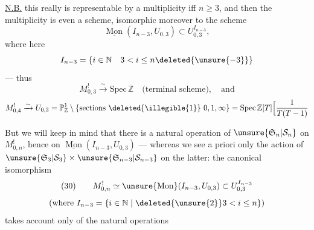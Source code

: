 
\uline{N.B.} this really is representable by a multiplicity iff $n\geq3$,  and then the multiplicity is even a scheme, isomorphic moreover  to the scheme
\[
\underline{\operatorname{Mon}}(I_{n-3},U_{0,3})\subset U_{0,3}^{I_{n-3}},
\]
where here
\[
I_{n-3}=\{i\in\mathbb N\quad3<i\leq n\deleted{\unsure{-3}}\}
\]
--- thus 
\[
M_{0,3}^{!}\xrightarrow{\sim}\mathrm{Spec}\,\mathbb Z\quad\text{(terminal scheme)},\quad\text{and}
\]
\[
M_{0,4}^{!}\xrightarrow{\sim}U_{0,3}=\mathbb P^1_{\mathbb Z}\setminus\{\text{sections \deleted{\illegible{1}} }0,1,\infty\}=\mathrm{Spec}\,\mathbb Z[T]\Bigl[\frac{1}{T(T-1)}
\]

But we will keep in mind that there is a natural operation of $\unsure{\mathfrak S_n|\mathcal S_n}$ on $M_{0,n}^{!}$, hence on $\underline{\operatorname{Mon}}(I_{n-3},U_{0,3})$ ---  whereas we see a priori only the action of $\unsure{\mathfrak S_3|\mathcal S_3}\times\unsure{\mathfrak S_{n-3}|\mathcal S_{n-3}}$ on the latter: the canonical isomorphism
\[
(30)\qquad M_{0,n}^{!}\simeq\unsure{\operatorname{Mon}}(I_{n-3},U_{0,3})\subset U_{0,3}^{I_{n-3}}
\]
\[
\text{(where }I_{n-3}=\{i\in\mathbb N\mid\deleted{\unsure{2}}3<i\leq n\}\text{)}
\]
takes account only of the natural operations 